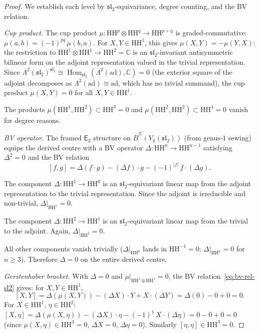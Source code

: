 \documentclass[11pt,reqno]{amsart}
\theoremstyle{definition}
\theoremstyle{remark}
\newcommand{\HH}{\mathrm{HH}}
\newcommand{\Etwo}{\mathsf{E}_{2}}
\DeclareMathOperator{\Hom}{Hom}
\newcommand{\BarSig}{\overline{B}^{\Sigma}}
\newcommand{\CC}{\mathbb{C}}
\numberwithin{equation}{section}
\begin{document}
\begin{proof}
We establish each level by $\mathfrak{sl}_2$-equivariance,
degree counting, and the BV relation.

\textit{Cup product.}
The cup product $\mu\colon \HH^p \otimes \HH^q
\to \HH^{p+q}$ is graded-commutative:
$\mu(a, b) = (-1)^{pq}\,\mu(b, a)$.
For $X, Y \in \HH^1$, this gives
$\mu(X, Y) = -\mu(Y, X)$: the restriction to
$\HH^1 \otimes \HH^1 \to \HH^2 = \CC$ is an
$\mathfrak{sl}_2$-invariant antisymmetric bilinear form
on the adjoint representation valued in the trivial
representation.
Since
$\Lambda^2(\mathfrak{sl}_2)^{\mathfrak{sl}_2}
\cong \Hom_{\mathfrak{sl}_2}(\Lambda^2(\mathrm{ad}), \CC)
= 0$
(the exterior square of the adjoint decomposes as
$\Lambda^2(\mathrm{ad}) \cong \mathrm{ad}$,
which has no trivial summand), the cup product
$\mu(X, Y) = 0$ for all $X, Y \in \HH^1$.

The products $\mu(\HH^1, \HH^2) \subset \HH^3 = 0$ and
$\mu(\HH^2, \HH^2) \subset \HH^4 = 0$ vanish for degree
reasons.

\textit{BV operator.}
The framed $\Etwo$ structure on $\BarSig(V_k(\mathfrak{sl}_2))$
(from genus-$1$ sewing) equips the derived centre with a BV
operator $\Delta\colon \HH^n \to \HH^{n-1}$ satisfying
$\Delta^2 = 0$ and the BV relation
\begin{equation}\label{eq:bv-rel-sl2}
  [f, g]
  = \Delta(f \cdot g) - (\Delta f) \cdot g
  - (-1)^{|f|}\,f \cdot (\Delta g).
\end{equation}

The component $\Delta\colon \HH^1 \to \HH^0$ is an
$\mathfrak{sl}_2$-equivariant linear map from the adjoint
representation to the trivial representation. Since the
adjoint is irreducible and non-trivial,
$\Delta|_{\HH^1} = 0$.

The component $\Delta\colon \HH^2 \to \HH^1$ is an
$\mathfrak{sl}_2$-equivariant linear map from the trivial
to the adjoint. Again, $\Delta|_{\HH^2} = 0$.

All other components vanish trivially
($\Delta|_{\HH^0}$ lands in $\HH^{-1} = 0$;
$\Delta|_{\HH^n} = 0$ for $n \geq 3$). Therefore
$\Delta = 0$ on the entire derived centre.

\textit{Gerstenhaber bracket.}
With $\Delta = 0$ and $\mu|_{\HH^1 \otimes \HH^1} = 0$,
the BV relation~\eqref{eq:bv-rel-sl2} gives:
for $X, Y \in \HH^1$,
\[
  [X, Y]
  = \Delta(\mu(X, Y)) - (\Delta X) \cdot Y
  + X \cdot (\Delta Y)
  = \Delta(0) - 0 + 0 = 0.
\]
For $X \in \HH^1$, $\eta \in \HH^2$:
$[X, \eta] = \Delta(\mu(X, \eta)) - (\Delta X) \cdot \eta
- (-1)^1\,X \cdot (\Delta \eta)
= 0 - 0 + 0 = 0$
(since $\mu(X, \eta) \in \HH^3 = 0$,
$\Delta X = 0$, $\Delta\eta = 0$).
Similarly $[\eta, \eta] \in \HH^3 = 0$.


\end{proof}
\end{document}
